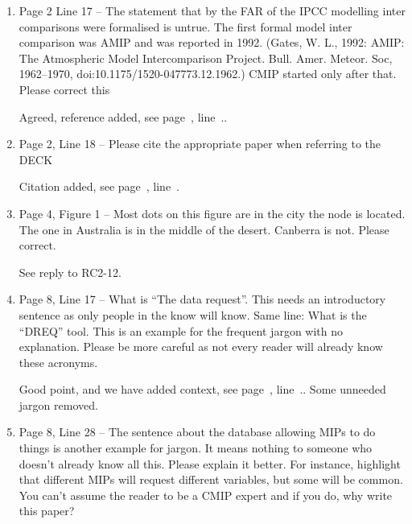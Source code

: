 \documentclass[gmd,manuscript]{copernicus}
\newcommand{\plref}[1]{see page~\pageref{p-#1}, line~\lineref{l-#1}.}
\newenvironment{answer}{\color{blue}}{}
\begin{document}
\begin{enumerate}[label=RC3-\arabic*,leftmargin=*]
  \begin{answer}
    This is a good point raised by RC1 as well, and we have provided
    some context, \plref{RC1-Overview-1}. The text and conclusions
    have been modified as well to make clear the audience and intent.
    A new section on Historical Context has been added,
    Section~\ref{sec:history}.
  \end{answer}

  More minor but often typical issues in chronological ordere
\item Page 2 Line 17 -- The statement that by the FAR of the IPCC
  modelling inter comparisons were formalised is untrue. The first
  formal model inter comparison was AMIP and was reported in 1992.
  (Gates, W. L., 1992: AMIP: The Atmospheric Model Intercomparison
  Project. Bull. Amer. Meteor. Soc, 1962--1970,
  doi:10.1175/1520-047773.12.1962.) CMIP started only after that.
  Please correct this

  \begin{answer}
    Agreed, reference added, \plref{RC1-6}.
  \end{answer}
\item Page 2, Line 18 -- Please cite the appropriate paper when
  referring to the DECK

  \begin{answer}
    Citation added, \plref{RC2-7}
  \end{answer}
\item Page 4, Figure 1 -- Most dots on this figure are in the city the
  node is located. The one in Australia is in the middle of the
  desert. Canberra is not. Please correct.

  \begin{answer}
    See reply to RC2-12.
  \end{answer}
\item Page 8, Line 17 -- What is “The data request”. This needs an
  introductory sentence as only people in the know will know. Same
  line: What is the “DREQ” tool. This is an example for the frequent
  jargon with no explanation. Please be more careful as not every
  reader will already know these acronyms.

  \begin{answer}
    Good point, and we have added context, \plref{RC2-18}. Some
    unneeded jargon removed.
  \end{answer}
\item Page 8, Line 28 -- The sentence about the database allowing MIPs
  to do things is another example for jargon. It means nothing to
  someone who doesn’t already know all this. Please explain it better.
  For instance, highlight that different MIPs will request different
  variables, but some will be common. You can’t assume the reader to
  be a CMIP expert and if you do, why write this paper?


\end{enumerate}
\end{document}
